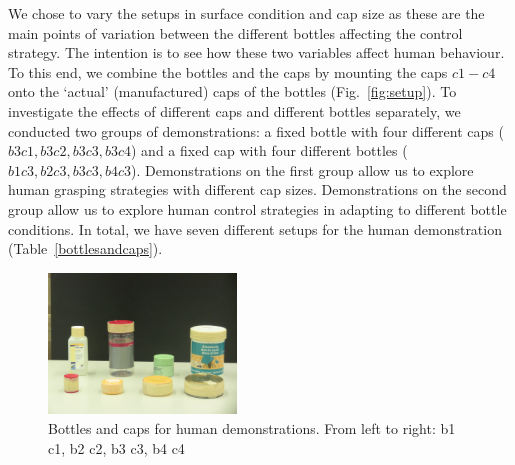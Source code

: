 
We chose to vary the setups in surface condition and cap size as these
are the main points of variation between the different bottles
affecting the control strategy. The intention is to see how these two
variables affect human behaviour. To this end, we combine the bottles
and the caps by mounting the caps $c1-c4$ onto the `actual'
(manufactured) caps of the bottles (Fig.~\ref{fig:setup}). To
investigate the effects of different caps and different bottles
separately, we conducted two groups of demonstrations: a fixed bottle with
four different caps ($b3c1, b3c2, b3c3, b3c4$) and a fixed cap with four
different bottles ($b1c3, b2c3, b3c3, b4c3$). Demonstrations on the
first group allow us to explore human grasping strategies with
different cap sizes. Demonstrations on the second group allow us to
explore human control strategies in adapting to different bottle
conditions. In total, we have seven different setups for the human
demonstration (Table~\ref{bottlesandcaps}).


\begin{figure}
  \centering
  \includegraphics[width=5cm]{./fig/b_c.jpg}
  \caption{ \scriptsize{Bottles and caps for human demonstrations. From left to right: b1 c1, b2 c2, b3 c3, b4  c4}
}
\label{fig:b_c}
\end{figure}





